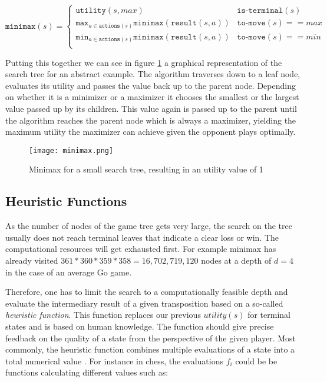 \begin{equation}
    \texttt{minimax}(s) =
    \begin{cases}
        \texttt{utility}(s, max)                                                      & \texttt{is-terminal}(s)    \\
        \texttt{max}_{a\in\texttt{actions}(s)}\texttt{minimax}(\texttt{result}(s, a)) & \texttt{to-move}(s) == max \\
        \texttt{min}_{a\in\texttt{actions}(s)}\texttt{minimax}(\texttt{result}(s, a)) & \texttt{to-move}(s) == min \\
    \end{cases}
\end{equation}

Putting this together we can see in figure \ref{minimax} a graphical representation of the search tree for an abstract example. The algorithm traverses down to a leaf node, evaluates its utility and passes the value back up to the parent node. Depending on whether it is a minimizer or a maximizer it chooses the smallest or the largest value passed up by its children. This value again is passed up to the parent until the algorithm reaches the parent node which is always a maximizer, yielding the maximum utility the maximizer can achieve given the opponent plays optimally.

\begin{figure}
    \centering
    \texttt{[image: minimax.png]}
    \caption{Minimax for a small search tree, resulting in an utility value of 1 \cite[cf. p. 303]{russell_artificial_2021}}
    \label{minimax}
\end{figure}

\subsection{Heuristic Functions}
As the number of nodes of the game tree gets very large, the search on the tree usually does not reach terminal leaves that indicate a clear loss or win. The computational resources will get exhausted first. For example minimax has already visited $ 361 * 360 * 359 * 358 = 16,702,719,120 $ nodes at a depth of $ d = 4 $ in the case of an average Go game.

Therefore, one has to limit the search to a computationally feasible depth and evaluate the intermediary result of a given transposition based on a so-called \textit{heuristic function}. This function replaces our previous $ utility(s) $ for terminal states and is based on human knowledge. The function should give precise feedback on the quality of a state from the perspective of the given player. Most commonly, the heuristic function combines multiple evaluations of a state into a total numerical value \cite[cf. p. 316]{russell_artificial_2021}. For instance in chess, the evaluations $ f_i $ could be be functions calculating different values such as:

